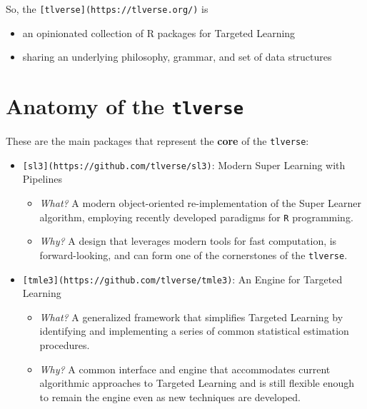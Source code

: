\documentclass[
  12pt, krantz2,
]{krantz}
\newcommand{\passthrough}[1]{#1}
\providecommand{\tightlist}{%
  \setlength{\itemsep}{0pt}\setlength{\parskip}{0pt}}
\theoremstyle{definition}
\theoremstyle{definition}
\theoremstyle{definition}
\newcommand{\1}{\mathbbm{1}}
\begin{document}
So, the \passthrough{\lstinline![tlverse](https://tlverse.org/)!} is

\begin{itemize}
\tightlist
\item
  an opinionated collection of R packages for Targeted Learning
\item
  sharing an underlying philosophy, grammar, and set of data structures
\end{itemize}

\hypertarget{anatomy-of-the-tlverse}{%
\section{\texorpdfstring{Anatomy of the \texttt{tlverse}}{Anatomy of the tlverse}}\label{anatomy-of-the-tlverse}}

These are the main packages that represent the \textbf{core} of the \passthrough{\lstinline!tlverse!}:

\begin{itemize}
\tightlist
\item
  \passthrough{\lstinline![sl3](https://github.com/tlverse/sl3)!}: Modern Super Learning with Pipelines

  \begin{itemize}
  \tightlist
  \item
    \emph{What?} A modern object-oriented re-implementation of the Super Learner algorithm, employing recently developed paradigms for \passthrough{\lstinline!R!} programming.
  \item
    \emph{Why?} A design that leverages modern tools for fast computation, is forward-looking, and can form one of the cornerstones of the \passthrough{\lstinline!tlverse!}.
  \end{itemize}
\item
  \passthrough{\lstinline![tmle3](https://github.com/tlverse/tmle3)!}: An Engine for Targeted Learning

  \begin{itemize}
  \tightlist
  \item
    \emph{What?} A generalized framework that simplifies Targeted Learning by identifying and implementing a series of common statistical estimation procedures.
  \item
    \emph{Why?} A common interface and engine that accommodates current algorithmic approaches to Targeted Learning and is still flexible enough to remain the engine even as new techniques are developed.
  \end{itemize}
\end{itemize}
\end{document}
